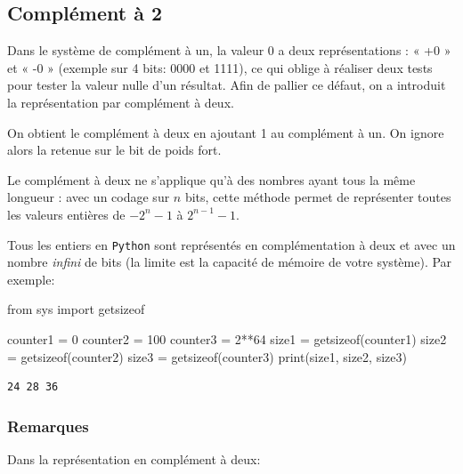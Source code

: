 \documentclass[
  letterpaper,
]{scrbook}
\newenvironment{Shaded}{}{}
\newcommand{\BuiltInTok}[1]{#1}
\newcommand{\DecValTok}[1]{\textcolor[rgb]{0.25,0.63,0.44}{#1}}
\newcommand{\ImportTok}[1]{#1}
\newcommand{\NormalTok}[1]{#1}
\newcommand{\OperatorTok}[1]{\textcolor[rgb]{0.40,0.40,0.40}{#1}}
\theoremstyle{plain}
\theoremstyle{definition}
\theoremstyle{definition}
\theoremstyle{remark}
\begin{document}
\hypertarget{compluxe9ment-uxe0-2}{%
\subsection{Complément à 2}\label{compluxe9ment-uxe0-2}}

Dans le système de complément à un, la valeur 0 a deux représentations :
« +0 » et « -0 » (exemple sur 4 bits: 0000 et 1111), ce qui oblige à
réaliser deux tests pour tester la valeur nulle d'un résultat. Afin de
pallier ce défaut, on a introduit la représentation par complément à
deux.

On obtient le complément à deux en ajoutant 1 au complément à un. On
ignore alors la retenue sur le bit de poids fort.

Le complément à deux ne s'applique qu'à des nombres ayant tous la même
longueur : avec un codage sur \(n\) bits, cette méthode permet de
représenter toutes les valeurs entières de \(−2^n − 1\) à
\(2^{n − 1} − 1\).

Tous les entiers en \texttt{Python} sont représentés en complémentation
à deux et avec un nombre \emph{infini} de bits (la limite est la
capacité de mémoire de votre système). Par exemple:

\begin{Shaded}
\begin{Highlighting}[]
\ImportTok{from}\NormalTok{ sys }\ImportTok{import}\NormalTok{ getsizeof}

\NormalTok{counter1 }\OperatorTok{=} \DecValTok{0}
\NormalTok{counter2 }\OperatorTok{=} \DecValTok{100}
\NormalTok{counter3 }\OperatorTok{=} \DecValTok{2}\OperatorTok{**}\DecValTok{64}
\NormalTok{size1 }\OperatorTok{=}\NormalTok{ getsizeof(counter1)}
\NormalTok{size2 }\OperatorTok{=}\NormalTok{ getsizeof(counter2)}
\NormalTok{size3 }\OperatorTok{=}\NormalTok{ getsizeof(counter3)}
\BuiltInTok{print}\NormalTok{(size1, size2, size3)}
\end{Highlighting}
\end{Shaded}

\begin{verbatim}
24 28 36
\end{verbatim}

\hypertarget{remarques}{%
\subsubsection*{Remarques}\label{remarques}}

Dans la représentation en complément à deux:
\end{document}

